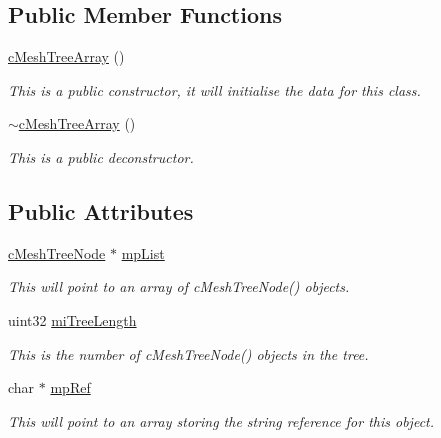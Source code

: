\subsection*{Public Member Functions}
\begin{DoxyCompactItemize}
\item 
\hyperlink{classc_mesh_tree_array_af8f0a2e58b086a46e5dd12aca2310377}{cMeshTreeArray} ()
\begin{DoxyCompactList}\small\item\em This is a public constructor, it will initialise the data for this class. \item\end{DoxyCompactList}\item 
\hyperlink{classc_mesh_tree_array_a98917f5d6920454275acf420d78e3f25}{$\sim$cMeshTreeArray} ()
\begin{DoxyCompactList}\small\item\em This is a public deconstructor. \item\end{DoxyCompactList}\end{DoxyCompactItemize}
\subsection*{Public Attributes}
\begin{DoxyCompactItemize}
\item 
\hyperlink{classc_mesh_tree_node}{cMeshTreeNode} $\ast$ \hyperlink{classc_mesh_tree_array_a83f4ee5f93ed62e7f939eed3b5e68cda}{mpList}
\begin{DoxyCompactList}\small\item\em This will point to an array of cMeshTreeNode() objects. \item\end{DoxyCompactList}\item 
uint32 \hyperlink{classc_mesh_tree_array_a23d238161a175633f64af87a2bc85984}{miTreeLength}
\begin{DoxyCompactList}\small\item\em This is the number of cMeshTreeNode() objects in the tree. \item\end{DoxyCompactList}\item 
char $\ast$ \hyperlink{classc_mesh_tree_array_a1114b12bb1a849122403e0d2e1fb2ec6}{mpRef}
\begin{DoxyCompactList}\small\item\em This will point to an array storing the string reference for this object. \item\end{DoxyCompactList}\end{DoxyCompactItemize}


